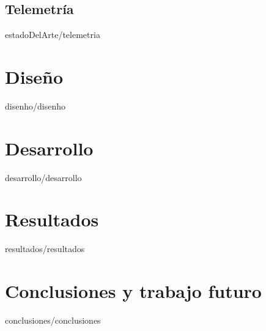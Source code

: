 \documentclass[epsbased, copyright, final, overleaf, printable, extendedindex, firstnumbered, tfg]{tfgtfmthesisuam}
\begin{document}
  \section{Telemetría\label{SEC:TELEMETRIA}}{estadoDelArte/telemetria}

\chapter{Diseño\label{CAP:DISENHO}}{disenho/disenho}

\chapter{Desarrollo\label{CAP:DESARROLLO}}{desarrollo/desarrollo}

\chapter{Resultados\label{CAP:RESULTADOS}}{resultados/resultados}

\chapter{Conclusiones y trabajo futuro\label{CAP:CONCLUSIONES}}{conclusiones/conclusiones}
\end{document}
